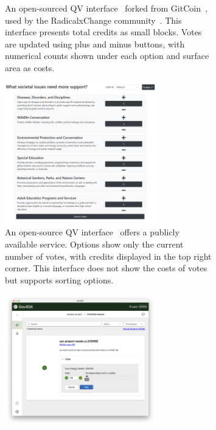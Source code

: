 {\begin{figure}[p]
\begin{subfigure}[b]{0.47\textwidth}
        \caption{An open-sourced QV interface~\cite{RadicalxChangeQuadraticvoting2024} forked from GitCoin~\cite{ReadWhitepaperGitcoin}, used by the RadicalxChange community~\cite{RxC}. This interface presents total credits as small blocks. Votes are updated using plus and minus buttons, with numerical counts shown under each option and surface area as costs.}
        \label{fig:rxcvotingInterface}
    \end{subfigure}
    
    \vspace{0.15cm}
    
    \begin{subfigure}[b]{0.47\textwidth}
        \centering
        \includegraphics[width=0.72\textwidth]{content/image/curr_interface/geek.sg_interface.png}
        \caption{An open-source QV interface~\cite{yehjxraymondYehjxraymondQvapp2024} offers a publicly available service. Options show only the current number of votes, with credits displayed in the top right corner. This interface does not show the costs of votes but supports sorting options.}
        \label{fig:yehInterface}
    \end{subfigure}
    \hspace{0.5cm}
    \begin{subfigure}[b]{0.47\textwidth}
        \centering
        \includegraphics[width=0.72\textwidth]{content/image/curr_interface/appvote.png}

\end{subfigure}
\end{figure}}
